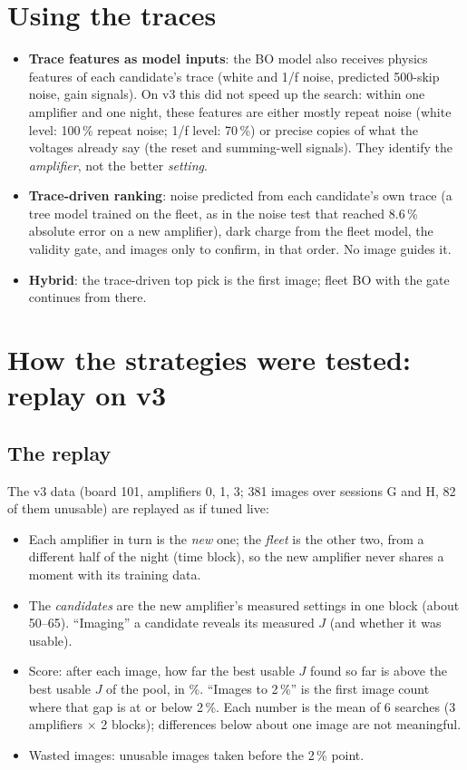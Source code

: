 \documentclass[11pt]{article}
\begin{document}
\section{Using the traces}
\begin{itemize}
\item \textbf{Trace features as model inputs}: the BO model also receives physics features of each candidate's trace
  (white and 1/f noise, predicted 500-skip noise, gain signals). On v3 this did not speed up the search: within one
  amplifier and one night, these features are either mostly repeat noise (white level: 100\,\% repeat noise; 1/f level:
  70\,\%) or precise copies of what the voltages already say (the reset and summing-well signals). They identify the
  \emph{amplifier}, not the better \emph{setting}.
\item \textbf{Trace-driven ranking}: noise predicted from each candidate's own trace (a tree model trained on the fleet,
  as in the noise test that reached 8.6\,\% absolute error on a new amplifier), dark charge from the fleet model, the
  validity gate, and images only to confirm, in that order. No image guides it.
\item \textbf{Hybrid}: the trace-driven top pick is the first image; fleet BO with the gate continues from there.
\end{itemize}

\section{How the strategies were tested: replay on v3}
\subsection{The replay}
The v3 data (board 101, amplifiers 0, 1, 3; 381 images over sessions G and H, 82 of them unusable) are replayed as if
tuned live:
\begin{itemize}
\item Each amplifier in turn is the \emph{new} one; the \emph{fleet} is the other two, from a different half of the night
  (time block), so the new amplifier never shares a moment with its training data.
\item The \emph{candidates} are the new amplifier's measured settings in one block (about 50--65). ``Imaging'' a candidate
  reveals its measured $J$ (and whether it was usable).
\item Score: after each image, how far the best usable $J$ found so far is above the best usable $J$ of the pool, in \%.
  ``Images to 2\,\%'' is the first image count where that gap is at or below 2\,\%. Each number is the mean of 6 searches
  (3 amplifiers $\times$ 2 blocks); differences below about one image are not meaningful.
\item Wasted images: unusable images taken before the 2\,\% point.
\end{itemize}
\end{document}

